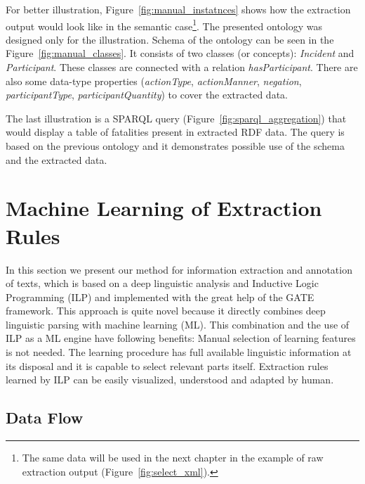 For better illustration, Figure~\ref{fig:manual_instatnces} shows how the extraction output would look like in the semantic case\footnote{The same data will be used in the next chapter in the example of raw extraction output (Figure~\ref{fig:select_xml}).}. The presented ontology was designed only for the illustration. Schema of the ontology can be seen in the Figure~\ref{fig:manual_classes}. It consists of two classes (or concepts): \emph{Incident} and \emph{Participant}. These classes are connected with a relation \emph{hasParticipant}. There are also some data-type properties (\emph{actionType}, \emph{actionManner}, \emph{negation}, \emph{participantType}, \emph{participantQuantity}) to cover the extracted data. 

The last illustration is a SPARQL query (Figure~\ref{fig:sparql_aggregation}) that would display a table of fatalities present in extracted RDF data. The query is based on the previous ontology and it demonstrates possible use of the schema and the extracted data.







\section{Machine Learning of Extraction Rules} \label{sec:learning_methods} \graphicspath{{../img/ch60/}}

In this section we present %
our method for information extraction and annotation of texts, which is based on a deep linguistic analysis and Inductive Logic Programming (ILP) and implemented with the great help of the GATE framework. This approach is quite novel because it directly combines deep linguistic parsing with machine learning (ML). This combination and the use of ILP as a ML engine have following benefits: Manual selection of learning features is not needed. 
The learning procedure has full available linguistic information at its disposal and it is capable to select relevant parts itself. Extraction rules learned by ILP can be easily visualized, understood and adapted by human.


\subsection{Data Flow}


